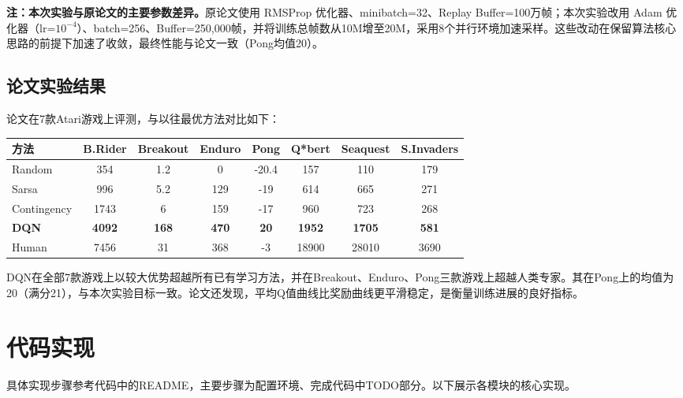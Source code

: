 \documentclass{article}
\begin{document}
\medskip
\begin{tcolorbox}[colback=gray!8, colframe=gray!50, boxrule=0.5pt,
    left=4pt, right=4pt, top=3pt, bottom=3pt]
\textbf{注：本次实验与原论文的主要参数差异。}原论文使用 RMSProp 优化器、minibatch=32、Replay Buffer=100万帧；本次实验改用 Adam 优化器（lr=$10^{-4}$）、batch=256、Buffer=250,000帧，并将训练总帧数从10M增至20M，采用8个并行环境加速采样。这些改动在保留算法核心思路的前提下加速了收敛，最终性能与论文一致（Pong均值20）。
\end{tcolorbox}

\subsection{论文实验结果}

论文在7款Atari游戏上评测，与以往最优方法对比如下：

\begin{center}
\begin{tabular}{lccccccc}
\toprule
方法 & B.Rider & Breakout & Enduro & Pong & Q*bert & Seaquest & S.Invaders \\
\midrule
Random & 354 & 1.2 & 0 & -20.4 & 157 & 110 & 179 \\
Sarsa & 996 & 5.2 & 129 & -19 & 614 & 665 & 271 \\
Contingency & 1743 & 6 & 159 & -17 & 960 & 723 & 268 \\
\textbf{DQN} & \textbf{4092} & \textbf{168} & \textbf{470} & \textbf{20} & \textbf{1952} & \textbf{1705} & \textbf{581} \\
Human & 7456 & 31 & 368 & -3 & 18900 & 28010 & 3690 \\
\bottomrule
\end{tabular}
\end{center}

DQN在全部7款游戏上以较大优势超越所有已有学习方法，并在Breakout、Enduro、Pong三款游戏上超越人类专家。其在Pong上的均值为20（满分21），与本次实验目标一致。论文还发现，平均Q值曲线比奖励曲线更平滑稳定，是衡量训练进展的良好指标。


\section{代码实现}

具体实现步骤参考代码中的README，主要步骤为配置环境、完成代码中TODO部分。以下展示各模块的核心实现。
\end{document}
